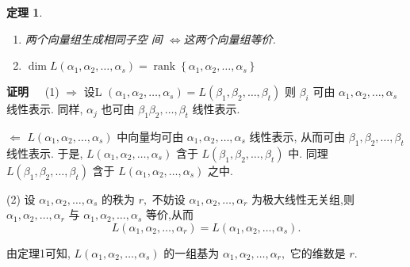 \documentclass[13pt]{beamer}
\newtheorem{thm}{定理}
\def\pf{{\bf 证明~~ }}
\begin{document}
\begin{frame}
\begin{thm}
\begin{enumerate}
\item 两个向量组生成相同子空 间 $\Leftrightarrow $这两个向量组等价.
\item $\operatorname{dim} L\left(\alpha_{1}, \alpha_{2}, \ldots, \alpha_{s}\right)
=\operatorname{rank}\left\{\alpha_{1}, \alpha_{2}, \ldots, \alpha_{s}\right\}$
\end{enumerate}

\end{thm}
\pf (1) $\Rightarrow$
设L $\left(\alpha_{1}, \alpha_{2}, \dots, \alpha_{s}\right)=L\left(\beta_{1}, \beta_{2}, \dots, \beta_{t}\right)$
则 $\beta_{i}$ 可由 $\alpha_{1}, \alpha_{2}, \ldots, \alpha_{s}$ 线性表示. 
同样, $\alpha_{j}$ 也可由 $\beta_{1} \beta_{2}, \ldots, \beta_{t}$ 线性表示.

$\Leftarrow$
${L}\left(\alpha_{1}, \alpha_{2}, \ldots, \alpha_{s}\right)$ 中向量均可由 $\alpha_{1}, \alpha_{2}, \ldots, \alpha_{s}$ 线性表示, 从而可由 $\beta_{1}, \beta_{2}, \ldots, \beta_{t}$ 线性表示.
于是, $L \left(\alpha_{1}, \alpha_{2}, \ldots, \alpha_{s}\right)$ 含于 $L \left(\beta_{1}, \beta_{2}, \ldots, \beta_{t}\right)$
中. 
同理 $L\left(\beta_{1}, \beta_{2}, \dots, \beta_{t}\right)$ 含于
$L\left(\alpha_{1}, \alpha_{2}, \ldots, \alpha_{s}\right)$ 之中. 

(2) 设 $\alpha_{1}, \alpha_{2}, \ldots, \alpha_{s}$ 的秩为 $r,$ 不妨设 $\alpha_{1}, \alpha_{2}, \ldots, \alpha_{r}$ 为极大线性无关组,则
$\alpha_{1}, \alpha_{2}, \ldots, \alpha_{r}$ 与 $\alpha_{1}, \alpha_{2}, \ldots, \alpha_{s}$ 等价,从而
$$L\left(\alpha_{1}, \alpha_{2}, \ldots, \alpha_{r}\right)=L\left(\alpha_{1}, \alpha_{2}, \ldots, \alpha_{s}\right).$$

由定理1可知, 
$L\left(\alpha_{1}, \alpha_{2}, \ldots, \alpha_{s}\right)$ 的一组基为
$\alpha_{1}, \alpha_{2}, \ldots, \alpha_{r},$ 它的维数是 $r$.
\end{frame}
\end{document}
